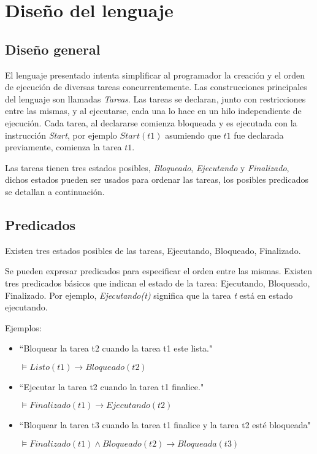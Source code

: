 
\section{Diseño del lenguaje}

\subsection{Diseño general}

El lenguaje presentado intenta simplificar al programador la creación
y el orden de ejecución de diversas tareas concurrentemente.
Las construcciones principales del lenguaje son llamadas \emph{Tareas}.
Las tareas se declaran, junto con restricciones entre las mismas, y
al ejecutarse, cada una lo hace en un hilo independiente de ejecución.
Cada tarea, al declararse comienza bloqueada y es ejecutada con la
instrucción \emph{Start}, por ejemplo $Start(t1)$ asumiendo que $t1$ fue
declarada previamente, comienza la tarea $t1$.

Las tareas tienen tres estados posibles, \emph{Bloqueado},
\emph{Ejecutando} y \emph{Finalizado}, dichos estados pueden ser usados
para ordenar las tareas, los posibles predicados se detallan a
continuación.

\subsection{Predicados}

Existen tres estados posibles de las tareas,
Ejecutando, Bloqueado, Finalizado.

Se pueden expresar predicados para especificar el orden entre las mismas.
Existen tres predicados básicos que indican el estado de la tarea: Ejecutando, Bloqueado, Finalizado.
Por ejemplo, \emph{Ejecutando(t)} significa que la tarea \emph{t} está en estado ejecutando.

Ejemplos:

\begin{itemize}
\item
``Bloquear la tarea t2 cuando la tarea t1 este lista."

$\models Listo(t1) \rightarrow Bloqueado(t2)$

\item
``Ejecutar la tarea t2 cuando la tarea t1 finalice."

$\models Finalizado(t1) \rightarrow Ejecutando(t2)$

\item
``Bloquear la tarea t3 cuando la tarea t1 finalice y la tarea t2 esté
bloqueada"

$\models Finalizado(t1) \land Bloqueado(t2) \rightarrow Bloqueada(t3)$

\end{itemize}


